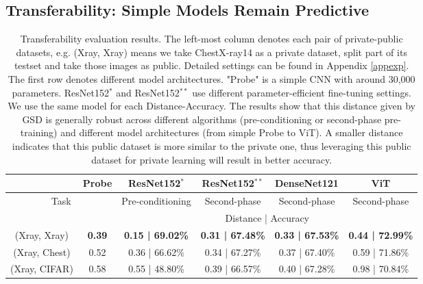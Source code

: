 \documentclass[11pt]{article}
\begin{document}
\subsection{Transferability: Simple Models Remain Predictive}\label{sec:transfer}
\begin{table*}[!h]
\caption{Transferability evaluation results. The left-most column denotes each pair of private-public datasets, e.g. (Xray, Xray) means we take ChestX-ray14 as a private dataset, split part of its testset and take those images as public. Detailed settings can be found in Appendix \ref{appexp}. The first row denotes different model architectures. "Probe" is a simple CNN with around 30,000 parameters. ResNet152$^*$ and ResNet152$^{**}$ use different parameter-efficient fine-tuning settings. We use the same model for each Distance-Accuracy. The results show that this distance given by GSD is generally robust across different algorithms (pre-conditioning or second-phase pre-training) and different model architectures (from simple Probe to ViT). A smaller distance indicates that this public dataset is more similar to the private one, thus leveraging this public dataset for private learning will result in better accuracy.}
\centering
\begin{adjustbox}{max width=\textwidth}
\begin{tabular}{cc|cccc}
\hline
                                   & Probe                 & ResNet152$^*$               & ResNet152$^{**}$               & DenseNet121                & ViT                     \\ \hline
\multicolumn{2}{c|}{Task}                                  & Pre-conditioning        & Second-phase            & Second-phase            & Second-phase            \\ \hline
\multicolumn{1}{l}{}               & \multicolumn{1}{l|}{} & \multicolumn{4}{c}{Distance | Accuracy}                                                               \\ \hline
\multicolumn{1}{c|}{(Xray, Xray)}  & \textbf{0.39}         & \textbf{0.15 | 69.02\%} & \textbf{0.31 | 67.48\%} & \textbf{0.33 | 67.53\%} & \textbf{0.44 | 72.99\%} \\
\multicolumn{1}{c|}{(Xray, Chest)} & 0.52                  & 0.36 | 66.62\%          & 0.34 | 67.27\%          & 0.37 | 67.40\%          & 0.59 | 71.86\%          \\
\multicolumn{1}{c|}{(Xray, CIFAR)} & 0.58                  & 0.55 | 48.80\%          & 0.39 | 66.57\%          & 0.40 | 67.28\%          & 0.98 | 70.84\%          \\ \hline

\end{tabular}
\end{adjustbox}
\end{table*}
\end{document}
